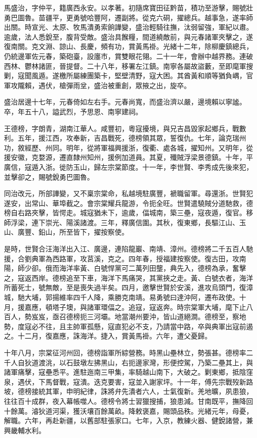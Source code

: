 \begin{pinyinscope}
馬盛治，字仲平，籍廣西永安。以孝著。初隨席寶田征黔苗，積功至游擊，賜號壯勇巴圖魯。苗疆平，更勇號哈豐阿，遷副將。從克六硐，擢總兵。越事急，遂率師出關。時宣光、太原、牧馬潰勇索餉譁變，盛治輕騎往撫，汰弱留強，軍紀以肅。逾歲，法人悉銳至，腹背受敵。盛治具餱糧，間道繞敵前，與元春諸軍夾擊之，遂復南關。克文淵、諒山、長慶，頻有功，賞黃馬褂。光緒十二年，除柳慶鎮總兵，仍統邊軍佐元春，築砲臺，設廛市，賞雙眼花翎。二十一年，會辦中越界務。連破西林、鬱林諸匪，晉提督。二十八年，移署左江鎮。南寧各屬故盜藪，至即麾軍搜剿，寇聞風遁。遂檄所屬練團築卡，堅壁清野，寇大困。其酋黃和順等猶負嵎，官軍攻隴賴，遇伏，槍彈雨坌，盛治被重創，眾掖之出，旋卒。

盛治居邊十七年，元春倚如左右手。元春尚寬，而盛治濟以嚴，邊境賴以寧謐。卒，年五十八，謚武烈，予思恩、南寧建祠。

王德榜，字朗青，湖南江華人。咸豐初，粵寇擾境，與兄吉昌毀家起鄉兵，戰數利。五年，援江西，攻奉新，吉昌戰死，德榜領其眾，誓復仇。七年，論克瑞州功，敘經歷、州同。明年，從將軍福興援浙，復衢、處各城，擢知州。又明年，從援安徽，克婺源，遷直隸州知州，援例加道員。其夏，殲賊浮梁景德鎮。十年，平廣信，寇遁入浙。徙防玉山，歸左宗棠節度。十一年，李世賢、李秀成先後來犯，並擊卻之，賜號銳勇巴圖魯。

同治改元，所部譁變，又不稟宗棠命，私越境駐廣豐，褫職留軍。尋還浙。世賢犯遂安，出常山、華埠截之。會宗棠耀兵龍游，令扼全旺。世賢遣驍賊分道馳救，德榜自右路夾擊，皆愕走。城寇猶未下，逾歲，偪城南，築三壘，寇夜遁，復官。移師浮梁，連下崇光、陽溪諸渡。三年，釋廣信圍。其秋，復東鄉，長驅江山、玉山、廣豐、鉛山，所至皆下，擢按察使。

是時，世賢合汪海洋出入江、廣邊，連陷龍巖、南靖、漳州。德榜將二千五百人馳援，合劉典軍為西路軍，攻莒溪，克之。四年春，授福建按察使。復古田，攻南陽，師少卻。俄而海洋率黃、白號悍黨可二萬列田壟，典先入，德榜為承，奮擊之，寇返西岸。德榜追至下車，海洋下馬痛哭，其黨挾之走。黃、白號衣者，海洋所蓄死士，號無敵，至是喪失過半矣。四月，邀擊世賢於安溪，進攻烏頭門，復漳城，馳大埔，郭揚維率四千人降，乘勝克南靖。易勇號曰達沖阿，遷布政使。十月，援嘉應，頓塔子墺，與諸軍環偪之。追寇，寇返奔。時宗棠軍大埔，麾下止八百人，勢岌岌，亟召德榜扼三河壩。地當潮州要沖，皆山道絕澗。德榜至，察地勢，度寇必不往，且主帥軍孤懸，寇直犯必不支，乃請當中路，卒與典軍出寇前遏之。十二月，復嘉應，誅海洋。捷入，賞黃馬褂。六年，遭父憂歸。

十年八月，宗棠征河州回，德榜詣軍所綜營務。時黑山壘林立，勢張甚。德榜率二千人自狄道渡洮，以石鼓墩左拂黑山，右扼邊家灣，形便控駕，乃築二壘其上，與諸軍痛擊，寇壘悉平。進駐迤南三甲集，率騎越山南下，大破之。剿東鄉，抵陰窪泉，遇伏，下馬督戰，寇潰。迭克要害，寇並入謝家坪。十一年，傅先宗戰歿新路坡，德榜接統其軍，申明紀律，誅將弁先潰者六人，士氣復新。羌地曠，夙患狼，往往百十成群，夜入幕帳噬人。德榜令將士習獵搜捕，狼患減。甘南既平，撫降回十餘萬。濬狄道河渠，獲沃壤百餘萬畝。降敕褒嘉，賜頭品秩。光緒元年，母憂，解職。六年，再赴新疆，以舊部駐張家口。七年，入京，教練火器、健銳諸營，兼興畿輔水利。


\end{pinyinscope}

